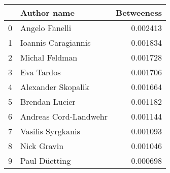 \begin{tabular}{llr}
\toprule
{} &            Author name &  Betweeness \\
\midrule
0 &         Angelo Fanelli &    0.002413 \\
1 &    Ioannis Caragiannis &    0.001834 \\
2 &         Michal Feldman &    0.001728 \\
3 &             Eva Tardos &    0.001706 \\
4 &     Alexander Skopalik &    0.001664 \\
5 &         Brendan Lucier &    0.001182 \\
6 &  Andreas Cord-Landwehr &    0.001144 \\
7 &      Vasilis Syrgkanis &    0.001093 \\
8 &            Nick Gravin &    0.001046 \\
9 &          Paul Düetting &    0.000698 \\
\bottomrule
\end{tabular}
